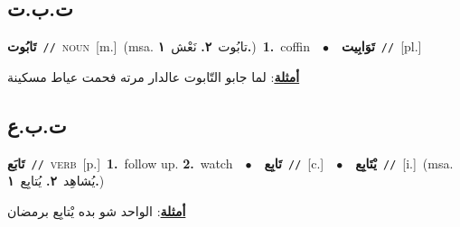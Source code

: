\documentclass[10pt,a4paper,twoside]{article} %
\begin{document}
\begin{multicols}{2}
\vspace{-3mm}
\subsection*{\color{blue}\foreignlanguage{arabic}{ت.ب.ت}\color{blue}{}} 

{\setlength\topsep{0pt}\textbf{\foreignlanguage{arabic}{تَابُوت}}\ {\color{gray}\texttt{//}\color{black}}\ \textsc{noun}\ [m.]\ \color{gray}(msa. \foreignlanguage{arabic}{تابُوت}~\foreignlanguage{arabic}{\textbf{٢.}}  \foreignlanguage{arabic}{نَعْش}~\foreignlanguage{arabic}{\textbf{١.}})\color{black}\ \textbf{1.}~coffin\ \ $\bullet$\ \ \setlength\topsep{0pt}\textbf{\foreignlanguage{arabic}{تَوَابِيت}}\ {\color{gray}\texttt{//}\color{black}}\ [pl.]\  \begin{flushright}\color{gray}\foreignlanguage{arabic}{\textbf{\underline{\foreignlanguage{arabic}{أمثلة}}}: لما جابو التّابوت عالدار مرته فحمت عياط مسكينة}\end{flushright}\color{black}} \vspace{2mm}

\vspace{-3mm}
\subsection*{\color{blue}\foreignlanguage{arabic}{ت.ب.ع}\color{blue}{}} 

{\setlength\topsep{0pt}\textbf{\foreignlanguage{arabic}{تَابَع}}\ {\color{gray}\texttt{//}\color{black}}\ \textsc{verb}\ [p.]\ \textbf{1.}~follow up.  \textbf{2.}~watch\ \ $\bullet$\ \ \setlength\topsep{0pt}\textbf{\foreignlanguage{arabic}{تَابِع}}\ {\color{gray}\texttt{//}\color{black}}\ [c.]\ \ $\bullet$\ \ \setlength\topsep{0pt}\textbf{\foreignlanguage{arabic}{يْتَابِع}}\ {\color{gray}\texttt{//}\color{black}}\ [i.]\ \color{gray}(msa. \foreignlanguage{arabic}{يُشاهِد}~\foreignlanguage{arabic}{\textbf{٢.}}  \foreignlanguage{arabic}{يُتابِع}~\foreignlanguage{arabic}{\textbf{١.}})\color{black}\  \begin{flushright}\color{gray}\foreignlanguage{arabic}{\textbf{\underline{\foreignlanguage{arabic}{أمثلة}}}: الواحد شو بده يْتابِع برمضان}\end{flushright}\color{black}} \vspace{2mm}


\end{multicols}
\end{document}
